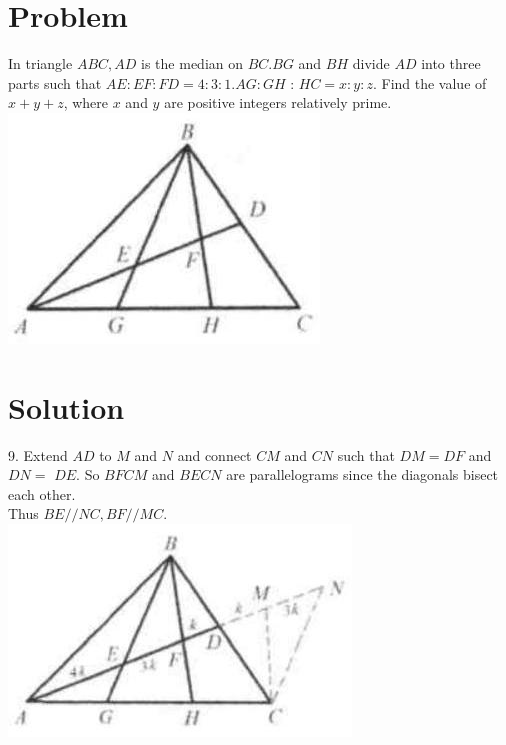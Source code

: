 \documentclass{article}
\begin{document}
\section*{Problem}
In triangle \(A B C, A D\) is the median on \(B C . B G\) and \(B H\) divide \(A D\) into three parts such that \(A E: E F: F D=4: 3: 1 . A G: G H\) : \(H C=x: y: z\). Find the value of \(x+y+z\), where \(x\) and \(y\) are positive integers relatively prime.\\
\centering
\includegraphics[width=\textwidth]{images/129(2).jpg}

\section*{Solution}
9.
Extend \(A D\) to \(M\) and \(N\) and connect \(C M\) and \(C N\) such that \(D M=D F\) and \(D N=\) \(D E\). So \(B F C M\) and \(B E C N\) are parallelograms since the diagonals bisect each other.\\
Thus \(B E / / N C, B F / / M C\).\\
\centering
\includegraphics[width=\textwidth]{images/140(1).jpg}
\end{document}
